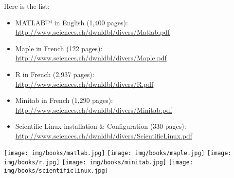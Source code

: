 	Here is the list:
	\begin{itemize}
		\item MATLAB™ in English (1,400 pages):\\ \href{http://www.sciences.ch/htmlfr/php/cliccount/click.php?id=319}{http://www.sciences.ch/dwnldbl/divers/Matlab.pdf}
		
		\item Maple in French (122 pages):\\ \href{http://www.sciences.ch/dwnldbl/divers/Maple.pdf}{http://www.sciences.ch/dwnldbl/divers/Maple.pdf}
		
		\item \textsf{R} in French (2,937 pages):\\ \href{http://www.sciences.ch/htmlfr/php/cliccount/click.php?id=313}{http://www.sciences.ch/dwnldbl/divers/R.pdf}
		
		\item Minitab in French (1,290 pages):\\ \href{http://www.sciences.ch/htmlfr/php/cliccount/click.php?id=282}{http://www.sciences.ch/dwnldbl/divers/Minitab.pdf}
		
		\item Scientific Linux installation \& Configuration (330 pages):\\ \href{http://www.sciences.ch/dwnldbl/divers/ScientificLinux.pdf}{http://www.sciences.ch/dwnldbl/divers/ScientificLinux.pdf}
	\end{itemize}
	\begin{center}
		\texttt{[image: img/books/matlab.jpg]}
		\texttt{[image: img/books/maple.jpg]}
		\texttt{[image: img/books/r.jpg]}
		\texttt{[image: img/books/minitab.jpg]}
		\texttt{[image: img/books/scientificlinux.jpg]} 
	\end{center}	
		
